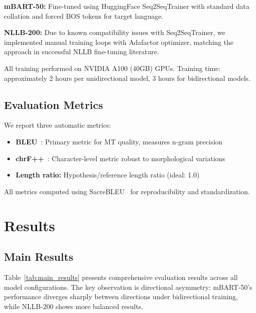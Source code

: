 \documentclass[manuscript, screen, review]{acmart}
\begin{document}
\textbf{mBART-50:} Fine-tuned using HuggingFace Seq2SeqTrainer with standard data collation and forced BOS tokens for target language.

\textbf{NLLB-200:} Due to known compatibility issues with Seq2SeqTrainer, we implemented manual training loops with Adafactor optimizer, matching the approach in successful NLLB fine-tuning literature.

All training performed on NVIDIA A100 (40GB) GPUs. Training time: approximately 2 hours per unidirectional model, 3 hours for bidirectional models.

\subsection{Evaluation Metrics}
\label{subsec:metrics}

We report three automatic metrics:

\begin{itemize}
\item \textbf{BLEU}~\cite{papineni2002bleu}: Primary metric for MT quality, measures n-gram precision

\item \textbf{chrF++}~\cite{popovic2015chrf}: Character-level metric robust to morphological variations

\item \textbf{Length ratio:} Hypothesis/reference length ratio (ideal: 1.0)
\end{itemize}

All metrics computed using SacreBLEU~\cite{post2018call} for reproducibility and standardization.

\section{Results}
\label{sec:results}

\subsection{Main Results}
\label{subsec:main_results}

Table~\ref{tab:main_results} presents comprehensive evaluation results across all model configurations. The key observation is directional asymmetry: mBART-50's performance diverges sharply between directions under bidirectional training, while NLLB-200 shows more balanced results.
\end{document}
